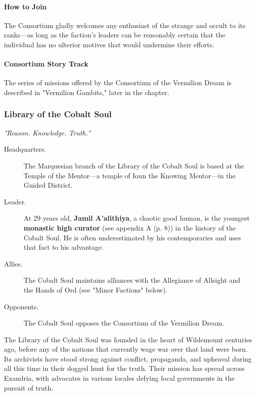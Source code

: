 \documentclass[letterpaper, 11pt, bg=full, twocolumn]{dndbook}
\begin{document}
\paragraph{How to Join}

The Consortium gladly welcomes any enthusiast of the strange and occult to its ranks---as long as the faction's leaders can be reasonably certain that the individual has no ulterior motives that would undermine their efforts.

\paragraph{Consortium Story Track}

The series of missions offered by the Consortium of the Vermilion Dream is described in "Vermilion Gambits," later in the chapter.

\subsubsection{Library of the Cobalt Soul}

\textit{"Reason. Knowledge. Truth."}

\begin{description}
\item[Headquarters.] The Marquesian branch of the Library of the Cobalt Soul is based at the Temple of the Mentor---a temple of Ioun the Knowing Mentor---in the Guided District.
\end{description}


\begin{description}
\item[Leader.] At 29 years old, \textbf{Jamil A'alithiya}, a chaotic good human, is the youngest \textbf{monastic high curator} (see appendix A (p. 8)) in the history of the Cobalt Soul. He is often underestimated by his contemporaries and uses that fact to his advantage.
\item[Allies.] The Cobalt Soul maintains alliances with the Allegiance of Allsight and the Hands of Ord (see "Minor Factions" below).
\item[Opponents.] The Cobalt Soul opposes the Consortium of the Vermilion Dream.
\end{description}

The Library of the Cobalt Soul was founded in the heart of Wildemount centuries ago, before any of the nations that currently wage war over that land were born. Its archivists have stood strong against conflict, propaganda, and upheaval during all this time in their dogged hunt for the truth. Their mission has spread across Exandria, with advocates in various locales defying local governments in the pursuit of truth.
\end{document}
